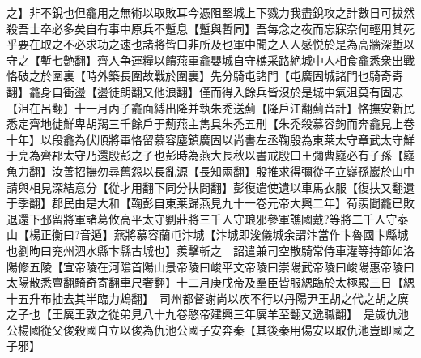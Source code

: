 之】非不銳也但龕用之無術以取敗耳今憑阻堅城上下戮力我盡銳攻之計數日可拔然殺吾士卒必多矣自有事中原兵不蹔息【蹔與暫同】吾每念之夜而忘寐奈何輕用其死乎要在取之不必求功之速也諸將皆曰非所及也軍中聞之人人感悦於是為高牆深塹以守之【塹七艶翻】齊人争運糧以饋燕軍龕嬰城自守樵采路絶城中人相食龕悉衆出戰恪破之於圍裏【時外築長圍故戰於圍裏】先分騎屯諸門【屯廣固城諸門也騎奇寄翻】龕身自衝盪【盪徒朗翻又他浪翻】僅而得入餘兵皆沒於是城中氣沮莫有固志【沮在呂翻】十一月丙子龕面縛出降并執朱禿送薊【降戶江翻薊音計】恪撫安新民悉定齊地徙鮮卑胡羯三千餘戶于薊燕主雋具朱禿五刑【朱禿殺慕容鉤而奔龕見上卷十年】以段龕為伏順將軍恪留慕容塵鎮廣固以尚書左丞鞠殷為東莱太守章武太守鮮于亮為齊郡太守乃還殷彭之子也彭時為燕大長秋以書戒殷曰王彌曹嶷必有子孫【嶷魚力翻】汝善招撫勿尋舊怨以長亂源【長知兩翻】殷推求得彌從子立嶷孫巖於山中請與相見深結意分【從才用翻下同分扶問翻】彭復遣使遺以車馬衣服【復扶又翻遺于季翻】郡民由是大和【鞠彭自東莱歸燕見九十一卷元帝大興二年】荀羨聞龕已敗退還下邳留將軍諸葛攸高平太守劉莊將三千人守琅邪參軍譙國戴?等將二千人守泰山【楊正衡曰?音遁】燕將慕容蘭屯汴城【汴城即浚儀城余謂汴當作卞魯國卞縣城也劉昫曰兖州泗水縣卞縣古城也】羨擊斬之　詔遣兼司空散騎常侍車灌等持節如洛陽修五陵【宣帝陵在河隂首陽山景帝陵曰峻平文帝陵曰崇陽武帝陵曰峻陽惠帝陵曰太陽散悉亶翻騎奇寄翻車尺奢翻】十二月庚戌帝及羣臣皆服緦臨於太極殿三日【緦十五升布抽去其半臨力鴆翻】　司州都督謝尚以疾不行以丹陽尹王胡之代之胡之廙之子也【王廙王敦之從弟見八十九卷愍帝建興三年廙羊至翻又逸職翻】　是歲仇池公楊國從父俊殺國自立以俊為仇池公國子安奔秦【其後秦用偒安以取仇池豈即國之子邪】

